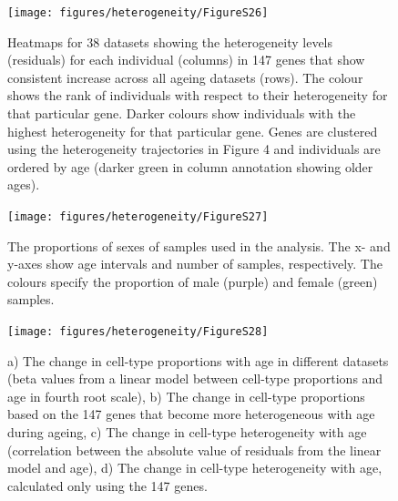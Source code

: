 \documentclass[12pt,twoside]{unicam}
\begin{document}
\begin{figure}

{\centering \texttt{[image: figures/heterogeneity/FigureS26]} 

}

\caption[Heatmaps for 38 datasets showing the heterogeneity levels for each individual in 147 genes that show consistent increase across all ageing datasets.]{Heatmaps for 38 datasets showing the heterogeneity levels (residuals) for each individual (columns) in 147 genes that show consistent increase across all ageing datasets (rows). The colour shows the rank of individuals with respect to their heterogeneity for that particular gene. Darker colours show individuals with the highest heterogeneity for that particular gene. Genes are clustered using the heterogeneity trajectories in Figure 4 and individuals are ordered by age (darker green in column annotation showing older ages).  }\label{fig:hetFigS26}
\end{figure}

\begin{figure}

{\centering \texttt{[image: figures/heterogeneity/FigureS27]} 

}

\caption[The proportions of sexes of samples used in the analysis.]{The proportions of sexes of samples used in the analysis. The x- and y-axes show age intervals and number of samples, respectively. The colours specify the proportion of male (purple) and female (green) samples.}\label{fig:hetFigS27}
\end{figure}

\begin{figure}

{\centering \texttt{[image: figures/heterogeneity/FigureS28]} 

}

\caption[The change in cell-type proportions and heterogeneities with age in different datasets.]{a) The change in cell-type proportions with age in different datasets (beta values from a linear model between cell-type proportions and age in fourth root scale), b) The change in cell-type proportions based on the 147 genes that become more heterogeneous with age during ageing, c) The change in cell-type heterogeneity with age (correlation between the absolute value of residuals from the linear model and age), d) The change in cell-type heterogeneity with age, calculated only using the 147 genes.}\label{fig:hetFigS28}
\end{figure}
\end{document}
